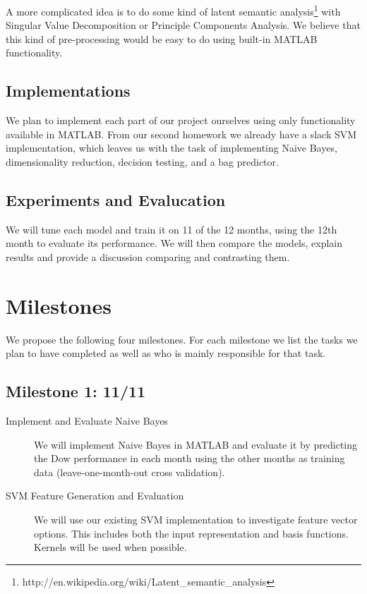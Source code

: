 \documentclass[10pt]{article}
\begin{document}
A more complicated idea is to do some kind of latent semantic analysis\footnote{http://en.wikipedia.org/wiki/Latent\_semantic\_analysis} with Singular Value Decomposition or Principle Components Analysis. We believe that this kind of pre-processing would be easy to do using built-in MATLAB functionality.

\subsection{Implementations}
We plan to implement each part of our project ourselves using only functionality available in MATLAB.
From our second homework we already have a slack SVM implementation, which leaves us with the task of implementing Naive Bayes, dimensionality reduction, decision testing, and a bag predictor.

\subsection{Experiments and Evalucation}
We will tune each model and train it on 11 of the 12 months, using the 12th month to evaluate its performance.
We will then compare the models, explain results and provide a discussion comparing and contrasting them.

\section{Milestones}
We propose the following four milestones. For each milestone we list the tasks we plan to have completed as well as who is mainly responsible for that task.

\subsection{Milestone 1: 11/11}

\begin{description}
\item[Implement and Evaluate Naive Bayes] We will implement Naive Bayes in MATLAB and evaluate it by predicting the Dow performance in each month using the other months as training data (leave-one-month-out cross validation).
\item[SVM Feature Generation and Evaluation] We will use our existing SVM implementation to investigate feature vector options. This includes both the input representation and basis functions. Kernels will be used when possible.

\end{description}
\end{document}
